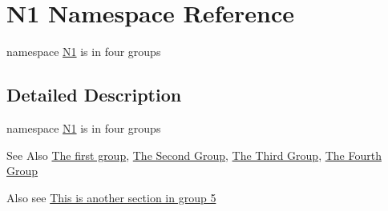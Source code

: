 \hypertarget{namespace_n1}{\section{N1 Namespace Reference}
\label{namespace_n1}
}


namespace \hyperlink{namespace_n1}{N1} is in four groups  




\subsection{Detailed Description}
namespace \hyperlink{namespace_n1}{N1} is in four groups \begin{DoxySeeAlso}{See Also}
\hyperlink{group__group1}{The first group}, \hyperlink{group__group2}{The Second Group}, \hyperlink{group__group3}{The Third Group}, \hyperlink{group__group4}{The Fourth Group}
\end{DoxySeeAlso}
Also see \hyperlink{group__group5}{This is another section in group 5} 